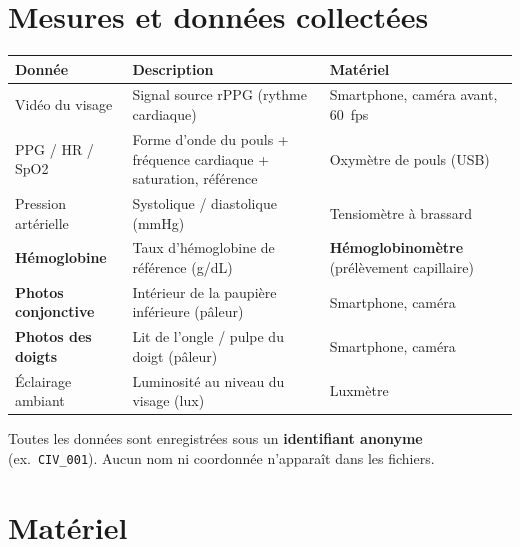 \documentclass[11pt,a4paper]{article}
\begin{document}
\section{Mesures et données collectées}

\begin{center}
\begin{tabularx}{\textwidth}{P{3.5cm} X P{4.2cm}}
\toprule
\textbf{Donnée} & \textbf{Description} & \textbf{Matériel} \\
\midrule
Vidéo du visage & Signal source rPPG (rythme cardiaque) & Smartphone, caméra avant, 60~fps \\
PPG / HR / SpO2 & Forme d'onde du pouls + fréquence cardiaque + saturation, référence & Oxymètre de pouls (USB) \\
Pression artérielle & Systolique / diastolique (mmHg) & Tensiomètre à brassard \\
\textbf{Hémoglobine} & Taux d'hémoglobine de référence (g/dL) & \textbf{Hémoglobinomètre} (prélèvement capillaire) \\
\textbf{Photos conjonctive} & Intérieur de la paupière inférieure (pâleur) & Smartphone, caméra \\
\textbf{Photos des doigts} & Lit de l'ongle / pulpe du doigt (pâleur) & Smartphone, caméra \\
Éclairage ambiant & Luminosité au niveau du visage (lux) & Luxmètre \\
\bottomrule
\end{tabularx}
\end{center}

\noindent Toutes les données sont enregistrées sous un \textbf{identifiant
anonyme} (ex.\ \texttt{CIV\_001}). Aucun nom ni coordonnée n'apparaît dans les
fichiers.

\section{Matériel}
\end{document}
